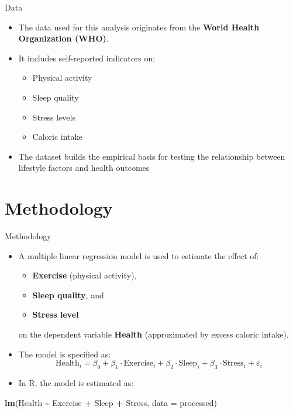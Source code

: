 \documentclass[
  11pt,
  ignorenonframetext,
]{beamer}
\newenvironment{Shaded}{\begin{snugshade}}{\end{snugshade}}
\newcommand{\AttributeTok}[1]{\textcolor[rgb]{0.13,0.29,0.53}{#1}}
\newcommand{\FunctionTok}[1]{\textcolor[rgb]{0.13,0.29,0.53}{\textbf{#1}}}
\newcommand{\NormalTok}[1]{#1}
\newcommand{\SpecialCharTok}[1]{\textcolor[rgb]{0.81,0.36,0.00}{\textbf{#1}}}
\providecommand{\tightlist}{%
  \setlength{\itemsep}{0pt}\setlength{\parskip}{0pt}}
\begin{document}
\begin{frame}{Data}
\begin{itemize}
\tightlist
\item
  The data used for this analysis originates from the \textbf{World
  Health Organization (WHO)}.
\item
  It includes self-reported indicators on:

  \begin{itemize}
  \tightlist
  \item
    Physical activity
  \item
    Sleep quality
  \item
    Stress levels
  \item
    Caloric intake
  \end{itemize}
\item
  The dataset builds the empirical basis for testing the relationship
  between lifestyle factors and health outcomes
\end{itemize}
\end{frame}

\section{Methodology}\label{methodology}

\begin{frame}[fragile]{Methodology}
\begin{itemize}
\item
  A multiple linear regression model is used to estimate the effect of:

  \begin{itemize}
  \tightlist
  \item
    \textbf{Exercise} (physical activity),
  \item
    \textbf{Sleep quality}, and
  \item
    \textbf{Stress level}
  \end{itemize}

  on the dependent variable \textbf{Health} (approximated by excess
  caloric intake).
\item
  The model is specified as: \[
  \text{Health}_i = \beta_0 + \beta_1 \cdot \text{Exercise}_i + \beta_2 \cdot \text{Sleep}_i + \beta_3 \cdot \text{Stress}_i + \varepsilon_i
  \]
\item
  In R, the model is estimated as:
\end{itemize}

\begin{Shaded}
\begin{Highlighting}[]
\FunctionTok{lm}\NormalTok{(Health }\SpecialCharTok{\textasciitilde{}}\NormalTok{ Exercise }\SpecialCharTok{+}\NormalTok{ Sleep }\SpecialCharTok{+}\NormalTok{ Stress, }\AttributeTok{data =}\NormalTok{ processed)}
\end{Highlighting}
\end{Shaded}
\end{frame}
\end{document}
